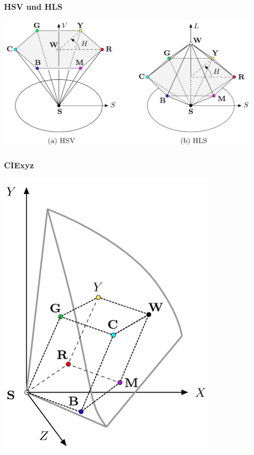 \documentclass[10pt]{article}
\begin{document}
\subsubsection{HSV und HLS}
\begin{center}
	\includegraphics[scale=0.2]{hsv-und-hls.png}
\end{center}
\subsubsection{CIExyz}
\begin{center}
	\includegraphics[scale=0.2]{cie_xyz.png}
\end{center}
\end{document}

